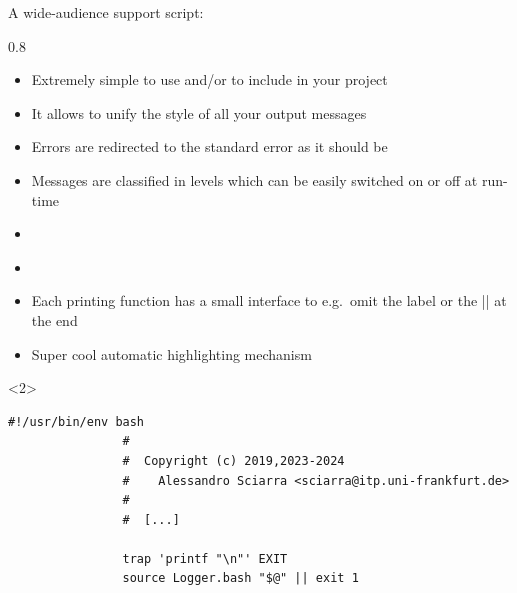 \begin{frame}[fragile]{A wide-audience support script: }
    \begin{overlayarea}{\textwidth}{0.8\textheight}
        \begin{itemize}[<only@1>]
            \setlength{\itemsep}{2mm}
            \item Extremely simple to use and/or to include in your project
            \item It allows to unify the style of all your output messages
            \item Errors are redirected to the standard error as it should be
            \item Messages are classified in levels which can be easily switched on or off at run-time
            \item {}\\
            \item {}\\
            \item Each printing function has a small interface to e.g.\ omit the label or the \bash|\n| at the end
            \item \alert{Super cool automatic highlighting mechanism}
        \end{itemize}
        \begin{onlyenv}<2>
            \begin{lstlisting}[style=myBash, aboveskip=0mm, numbers=none, style=smaller, xleftmargin=-1mm, xrightmargin=-1mm]
                #!/usr/bin/env bash
                #
                #  Copyright (c) 2019,2023-2024
                #    Alessandro Sciarra <sciarra@itp.uni-frankfurt.de>
                #
                #  [...]

                trap 'printf "\n"' EXIT
                source Logger.bash "$@" || exit 1


\end{lstlisting}
\end{onlyenv}
\end{overlayarea}
\end{frame}
